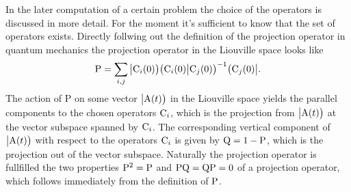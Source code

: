 In the later computation of a certain problem the choice of the operators is discussed in more detail.
For the moment it's sufficient to know that the set of operators exists.
Directly follwing out the definition of the projection operator in quantum mechanics the projection operator in the Liouville space looks like
%
\begin{align}
	\mathrm{P} = \sum\limits_{i,j} \big|{\mathrm{C}_{i}(0)}\big) \big({\mathrm{C}_{i}(0)}\big|{\mathrm{C}_{j}(0)}\big)^{-1} \big({\mathrm{C}_{j}(0)}\big|.
	\label{eq: projection operator}
\end{align}
%
The action of P on some vector $\big|{\mathrm{A}(t)}\big)$ in the Liouville space yields the parallel components to the chosen operators $\mathrm{C}_{i}$, which is the projection from $\big|{\mathrm{A}(t)}\big)$ at the vector subspace spanned by $\mathrm{C}_{i}$. 
The corresponding vertical component of $\big|{\mathrm{A}(t)}\big)$ with respect to the operators $\mathrm{C}_{i}$ is given by $\mathrm{Q} = 1- \mathrm{P}$, which is the projection out of the vector subspace.
Naturally the projection operator is fullfilled the two properties $\mathrm{P}^{2} = \mathrm{P}$ and $\mathrm{PQ} = \mathrm{QP} = 0$ of a projection operator, which follows immediately from the definition of $\mathrm{P}$.

